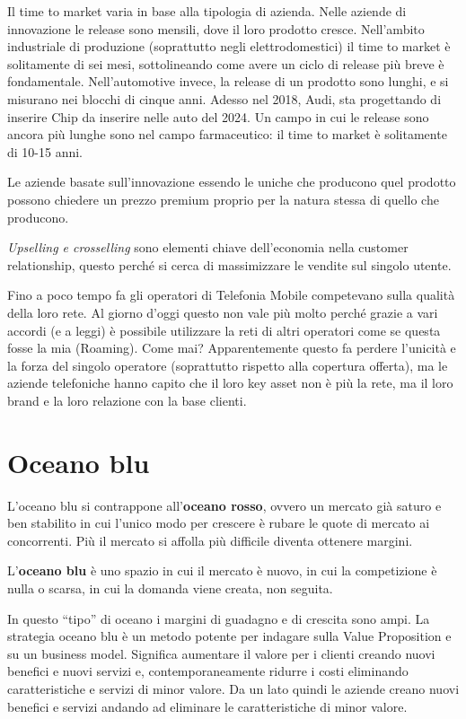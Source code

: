 Il time to market varia in base alla tipologia di azienda. Nelle aziende di
innovazione le release sono mensili, dove il loro prodotto cresce. Nell'ambito
industriale di produzione (soprattutto negli elettrodomestici) il time to
market è solitamente di sei mesi, sottolineando come avere un ciclo di release
più breve è fondamentale. Nell'automotive invece, la release di un prodotto
sono lunghi, e si misurano nei blocchi di cinque anni. Adesso nel 2018, Audi,
sta progettando di inserire Chip da inserire nelle auto del 2024. Un campo in
cui le release sono ancora più lunghe sono nel campo farmaceutico: il time to
market è solitamente di 10-15 anni.

Le aziende basate sull'innovazione essendo le uniche che producono quel
prodotto possono chiedere un prezzo premium proprio per la natura stessa di
quello che producono.

\textit{Upselling e crosselling} sono elementi chiave dell'economia nella
customer relationship, questo perché si cerca di massimizzare le vendite sul
singolo utente.

Fino a poco tempo fa gli operatori di Telefonia Mobile competevano sulla
qualità della loro rete. Al giorno d'oggi questo non vale più molto perché
grazie a vari accordi (e a leggi) è possibile utilizzare la reti di altri
operatori come se questa fosse la mia (Roaming). Come mai? Apparentemente
questo fa perdere l'unicità e la forza del singolo operatore (soprattutto
rispetto alla copertura offerta), ma le aziende telefoniche hanno capito che il
loro key asset non è più la rete, ma il loro brand e la loro relazione con la
base clienti.


\section{Oceano blu}

L'oceano blu si contrappone all'\textbf{oceano rosso}, ovvero un mercato già
saturo e ben stabilito in cui l'unico modo per crescere è rubare le quote di
mercato ai concorrenti. Più il mercato si affolla più difficile diventa
ottenere margini.

\begin{definition}
L'\textbf{oceano blu} è uno spazio in cui il mercato è nuovo, in cui la
competizione è nulla o scarsa, in cui la domanda viene creata, non seguita.
\end{definition}

\noindent In questo ``tipo'' di oceano i margini di guadagno e di crescita sono
ampi. La strategia oceano blu è un metodo potente per indagare sulla Value
Proposition e su un business model. Significa aumentare il valore per i clienti
creando nuovi benefici e nuovi servizi e, contemporaneamente ridurre i costi
eliminando caratteristiche e servizi di minor valore.
Da un lato quindi le aziende creano nuovi benefici e servizi andando ad
eliminare le caratteristiche di minor valore.

